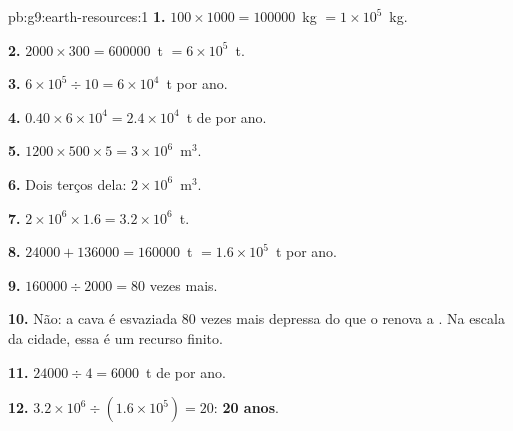 \begin{solution}{pb:g9:earth-resources:1}
\textbf{1.} $100 \times 1000 = \num{100000}$~kg $= 1 \times 10^5$~kg.

\textbf{2.} $2000 \times 300 = \num{600000}$~t $= 6 \times 10^5$~t.

\textbf{3.} $6 \times 10^5 \div 10 = 6 \times 10^4$~t por ano.

\textbf{4.} $0.40 \times 6 \times 10^4 = 2.4 \times 10^4$~t de  por
ano.

\textbf{5.} $1200 \times 500 \times 5 = 3 \times 10^6$~m$^3$.

\textbf{6.} Dois terços dela: $2 \times 10^6$~m$^3$.

\textbf{7.} $2 \times 10^6 \times 1.6 = 3.2 \times 10^6$~t.

\textbf{8.} $\num{24000} + \num{136000} = \num{160000}$~t $= 1.6 \times
10^5$~t por ano.

\textbf{9.} $\num{160000} \div 2000 = 80$ vezes mais.

\textbf{10.} Não: a cava é esvaziada 80 vezes mais depressa do que o 
renova a . Na escala da cidade, essa  é um recurso finito.

\textbf{11.} $\num{24000} \div 4 = \num{6000}$~t de  por ano.

\textbf{12.} $3.2 \times 10^6 \div (1.6 \times 10^5) = 20$: \textbf{20 anos}.
\end{solution}
